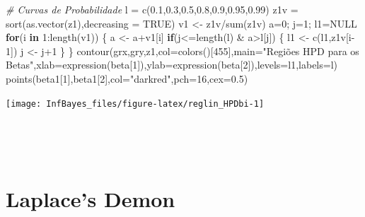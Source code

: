 \documentclass[
]{book}
\newenvironment{Shaded}{\begin{snugshade}}{\end{snugshade}}
\newcommand{\AttributeTok}[1]{\textcolor[rgb]{0.77,0.63,0.00}{#1}}
\newcommand{\CommentTok}[1]{\textcolor[rgb]{0.56,0.35,0.01}{\textit{#1}}}
\newcommand{\ConstantTok}[1]{\textcolor[rgb]{0.00,0.00,0.00}{#1}}
\newcommand{\ControlFlowTok}[1]{\textcolor[rgb]{0.13,0.29,0.53}{\textbf{#1}}}
\newcommand{\DecValTok}[1]{\textcolor[rgb]{0.00,0.00,0.81}{#1}}
\newcommand{\FloatTok}[1]{\textcolor[rgb]{0.00,0.00,0.81}{#1}}
\newcommand{\FunctionTok}[1]{\textcolor[rgb]{0.00,0.00,0.00}{#1}}
\newcommand{\NormalTok}[1]{#1}
\newcommand{\OtherTok}[1]{\textcolor[rgb]{0.56,0.35,0.01}{#1}}
\newcommand{\SpecialCharTok}[1]{\textcolor[rgb]{0.00,0.00,0.00}{#1}}
\newcommand{\StringTok}[1]{\textcolor[rgb]{0.31,0.60,0.02}{#1}}
\begin{document}
\begin{Shaded}
\begin{Highlighting}[]
\CommentTok{\# Curvas de Probabilidade}
\NormalTok{l }\OtherTok{=} \FunctionTok{c}\NormalTok{(}\FloatTok{0.1}\NormalTok{,}\FloatTok{0.3}\NormalTok{,}\FloatTok{0.5}\NormalTok{,}\FloatTok{0.8}\NormalTok{,}\FloatTok{0.9}\NormalTok{,}\FloatTok{0.95}\NormalTok{,}\FloatTok{0.99}\NormalTok{)}
\NormalTok{z1v }\OtherTok{=} \FunctionTok{sort}\NormalTok{(}\FunctionTok{as.vector}\NormalTok{(z1),}\AttributeTok{decreasing =} \ConstantTok{TRUE}\NormalTok{)}
\NormalTok{v1 }\OtherTok{\textless{}{-}}\NormalTok{ z1v}\SpecialCharTok{/}\FunctionTok{sum}\NormalTok{(z1v)}
\NormalTok{a}\OtherTok{=}\DecValTok{0}\NormalTok{; j}\OtherTok{=}\DecValTok{1}\NormalTok{; l1}\OtherTok{=}\ConstantTok{NULL}
\ControlFlowTok{for}\NormalTok{(i }\ControlFlowTok{in} \DecValTok{1}\SpecialCharTok{:}\FunctionTok{length}\NormalTok{(v1)) \{}
\NormalTok{  a }\OtherTok{\textless{}{-}}\NormalTok{ a}\SpecialCharTok{+}\NormalTok{v1[i]}
  \ControlFlowTok{if}\NormalTok{(j}\SpecialCharTok{\textless{}=}\FunctionTok{length}\NormalTok{(l) }\SpecialCharTok{\&}\NormalTok{ a}\SpecialCharTok{\textgreater{}}\NormalTok{l[j]) \{}
\NormalTok{    l1 }\OtherTok{\textless{}{-}} \FunctionTok{c}\NormalTok{(l1,z1v[i}\DecValTok{{-}1}\NormalTok{])}
\NormalTok{    j }\OtherTok{\textless{}{-}}\NormalTok{ j}\SpecialCharTok{+}\DecValTok{1}
\NormalTok{  \}}
\NormalTok{\}}
\FunctionTok{contour}\NormalTok{(grx,gry,z1,}\AttributeTok{col=}\FunctionTok{colors}\NormalTok{()[}\DecValTok{455}\NormalTok{],}\AttributeTok{main=}\StringTok{"Regiões HPD para os Betas"}\NormalTok{,}\AttributeTok{xlab=}\FunctionTok{expression}\NormalTok{(beta[}\DecValTok{1}\NormalTok{]),}\AttributeTok{ylab=}\FunctionTok{expression}\NormalTok{(beta[}\DecValTok{2}\NormalTok{]),}\AttributeTok{levels=}\NormalTok{l1,}\AttributeTok{labels=}\NormalTok{l)}
\FunctionTok{points}\NormalTok{(beta1[}\DecValTok{1}\NormalTok{],beta1[}\DecValTok{2}\NormalTok{],}\AttributeTok{col=}\StringTok{"darkred"}\NormalTok{,}\AttributeTok{pch=}\DecValTok{16}\NormalTok{,}\AttributeTok{cex=}\FloatTok{0.5}\NormalTok{)}
\end{Highlighting}
\end{Shaded}

\begin{center}\texttt{[image: InfBayes\_files/figure-latex/reglin\_HPDbi-1]} \end{center}

\(~\)

\(~\)

\hypertarget{laplaces-demon}{%
\section{Laplace's Demon}\label{laplaces-demon}}
\end{document}
